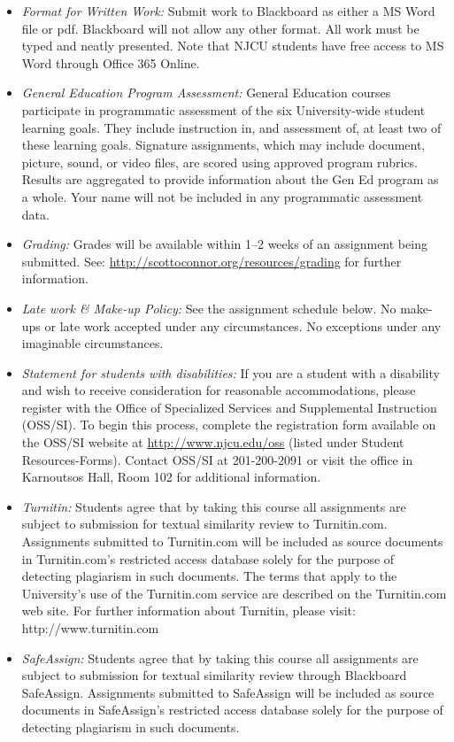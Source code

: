 \documentclass[article,oneside]{memoir}
\begin{document}
\begin{itemize}
\item \textit{Format for Written Work:} Submit work to Blackboard as either a MS Word file or pdf. Blackboard will not allow any other format. All work must be typed and neatly presented. Note that NJCU students have free access to MS Word through Office 365 Online.


\item \textit{General Education Program Assessment:} General Education courses participate in programmatic assessment of the six University-wide student learning goals. They include instruction in, and assessment of, at least two of these learning goals. Signature assignments, which may include document, picture, sound, or video files, are scored using approved program rubrics. Results are aggregated to provide information about the Gen Ed program as a whole. Your name will not be included in any programmatic assessment data.

\item \textit{Grading:} Grades will be available within 1--2 weeks of an assignment being submitted. See: \href{http://scottoconnor.org/resources/grading}{http://scottoconnor.org/resources/grading} for further information.


\item \textit{Late work \& Make-up Policy:} See the assignment schedule below. No make-ups or late work accepted under any circumstances. No exceptions under any imaginable circumstances.

\item \textit{Statement for students with disabilities:} If you are a student
with a disability and wish to receive consideration for reasonable
accommodations, please register with the Office of Specialized Services
and Supplemental Instruction (OSS/SI). To begin this process, complete
the registration form available on the OSS/SI website at
\href{http://www.njcu.edu/oss}{http://www.njcu.edu/oss}
(listed under Student Resources-Forms). Contact OSS/SI at 201-200-2091
or visit the office in Karnoutsos Hall, Room 102 for additional
information.

\item \textit{Turnitin:} Students agree that by taking this course all assignments are subject to submission for textual similarity review to Turnitin.com. Assignments submitted to Turnitin.com will be included as source documents in Turnitin.com's restricted access database solely for the purpose of detecting plagiarism in such documents.  The terms that apply to the University’s use of the Turnitin.com service are described on the Turnitin.com web site.  For further information about Turnitin, please visit: http://www.turnitin.com 

\item \textit{SafeAssign:} Students agree that by taking this course all assignments are subject to submission for textual similarity review through Blackboard SafeAssign. Assignments submitted to SafeAssign will be included as source documents in SafeAssign's restricted access database solely for the purpose of detecting plagiarism in such documents.  


\end{itemize}
\end{document}
